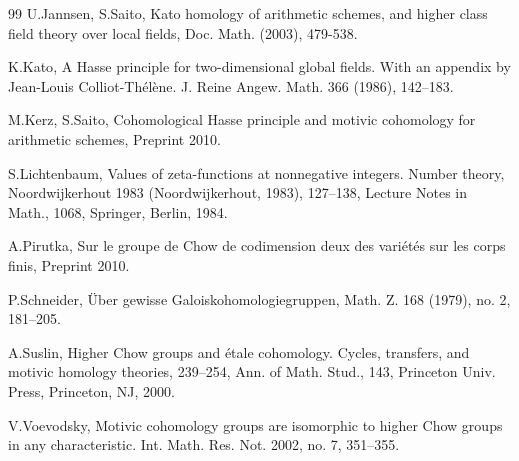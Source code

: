 \documentclass[nospthms,envcountsect]{svmult} %
\begin{document}
\begin{thebibliography}{99}
 {\sc U.Jannsen, S.Saito}, Kato homology
of arithmetic schemes, and higher class field theory over local
fields, Doc. Math. (2003), 479-538.

 {\sc K.Kato}, A Hasse principle for two-dimensional global
fields. With an appendix by Jean-Louis Colliot-Th\'el\`ene. J. Reine
Angew. Math. 366 (1986), 142--183.

 {\sc M.Kerz, S.Saito}, Cohomological Hasse principle and
motivic cohomology for arithmetic schemes, Preprint 2010.

 {\sc S.Lichtenbaum}, 
Values of zeta-functions at nonnegative integers. Number theory, 
Noordwijkerhout 1983 (Noordwijkerhout, 1983), 127--138, 
Lecture Notes in Math., 1068, Springer, Berlin, 1984.

 {\sc A.Pirutka}, Sur le groupe de Chow de codimension
deux des vari\'et\'es sur les corps finis, Preprint 2010.

 {\sc P.Schneider}, \"Uber gewisse Galoiskohomologiegruppen,
Math. Z. 168 (1979), no. 2, 181--205.

 {\sc A.Suslin}, Higher Chow groups and
\'etale cohomology.
Cycles, transfers, and motivic homology theories, 239--254, Ann. of
Math. Stud., 143, Princeton Univ. Press, Princeton, NJ, 2000.

 {\sc V.Voevodsky}, Motivic cohomology groups are
isomorphic to higher Chow groups in any characteristic. Int. Math.
Res. Not. 2002, no. 7, 351--355.
\end{thebibliography}
\end{document}
